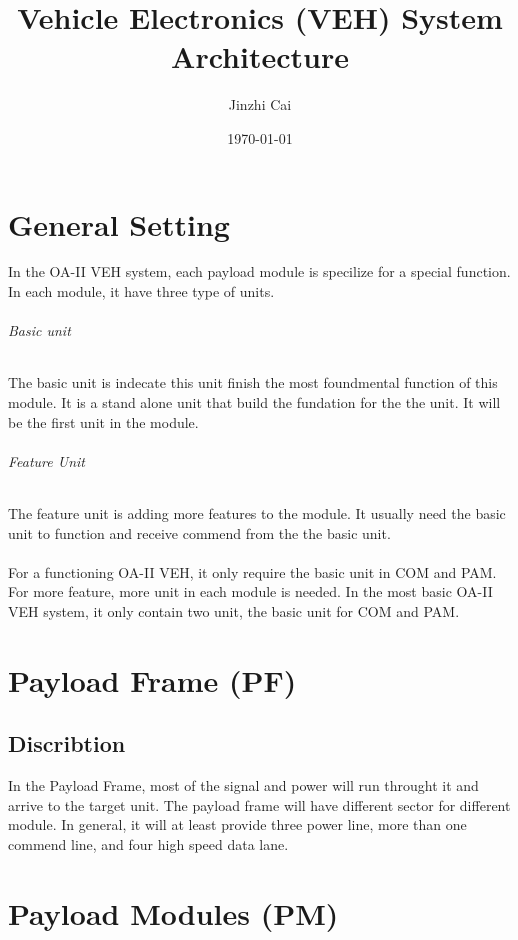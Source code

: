 \documentclass[12pt,article]{memoir}
\title{Vehicle Electronics (VEH) System Architecture}
\author{Jinzhi Cai}
\date{\today}
\begin{document}
	


\tableofcontents*
\clearpage

\chapter{General Setting}
	In the OA-II VEH system, each payload module is specilize for a special function. In each module, it have three type of units.
\subparagraph{Basic unit}%
The basic unit is indecate this unit finish the most foundmental function of this module. It is a stand alone unit that build the fundation for the the unit. It will be the first unit in the module. 
\subparagraph{Feature Unit}%
The feature unit is adding more features to the module. It usually need the basic unit to function and receive commend from the the basic unit.\\\\
For a functioning OA-II VEH, it only require the basic unit in COM and PAM. For more feature, more unit in each module is needed. In the most basic OA-II VEH system, it only contain two unit, the basic unit for COM and PAM.
\newpage
\chapter{Payload Frame (PF)}
\section{Discribtion}
In the Payload Frame, most of the signal and power will run throught it and arrive to the target unit. The payload frame will have different sector for different module. In general, it will at least provide three power line, more than one commend line, and four high speed data lane.
\newpage
\chapter{Payload Modules (PM)}
\end{document}
